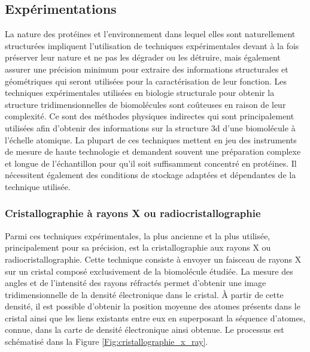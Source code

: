\subsection{Expérimentations}

La nature des protéines et l'environnement dans lequel elles sont naturellement structurées impliquent l'utilisation de techniques expérimentales devant à la fois préserver leur nature et ne pas les dégrader ou les détruire, mais également assurer une précision minimum pour extraire des informations structurales et géométriques qui seront utilisées pour la caractérisation de leur fonction.
Les techniques expérimentales utilisées en biologie structurale pour obtenir la structure tridimensionnelles de biomolécules sont coûteuses en raison de leur complexité. Ce sont des méthodes physiques indirectes qui sont principalement utilisées afin d'obtenir des informations sur la structure 3d d'une biomolécule à l'échelle atomique. La plupart de ces techniques mettent en jeu des instruments de mesure de haute technologie et demandent souvent une préparation complexe et longue de l'échantillon pour qu'il soit suffisamment concentré en protéines. Il nécessitent également des conditions de stockage adaptées et dépendantes de la technique utilisée.

\subsubsection{Cristallographie à rayons X ou radiocristallographie}

Parmi ces techniques expérimentales, la plus ancienne et la plus utilisée, principalement pour sa précision, est la cristallographie aux rayons X ou radiocristallographie. Cette technique consiste à envoyer un faisceau de rayons X sur un cristal composé exclusivement de la biomolécule étudiée. La mesure des angles et de l'intensité des rayons réfractés permet d'obtenir une image tridimensionnelle de la densité électronique dans le cristal. À partir de cette densité, il est possible d'obtenir la position moyenne des atomes présents dans le cristal ainsi que les liens existants entre eux en superposant la séquence d'atomes, connue, dans la carte de densité électronique ainsi obtenue. Le processus est schématisé dans la Figure \ref{Fig:cristallographie_x_ray}.

